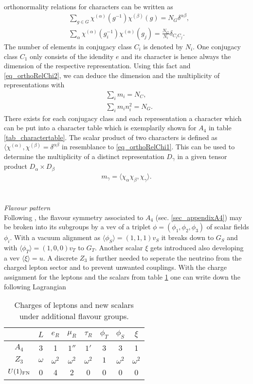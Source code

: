 orthonormality relations for characters can be written as
\begin{align}
 &\sum\limits_{g\in G} \chi^{(\alpha)}(g^{-1})\chi^{(\beta)}(g) = N_G \delta^{\alpha\beta},\label{eq_orthoRelChi1}\\
 &\sum\limits_\alpha \chi^{(\alpha)}(g^{-1}_i)\chi^{(\alpha)}(g_j) = \frac{N_G}{N_i} \delta_{C_iC_j}.
 \label{eq_orthoRelChi2}
\end{align}
The number of elements in conjugacy class $C_i$ is denoted by $N_i$. One conjugacy class $C_1$ only consists of the idendity $e$ and its character 
is hence always the dimension of the respective representation. Using this fact and \eqref{eq_orthoRelChi2}, we can deduce the dimension and the
multiplicity of representations with 
\begin{align}
 &\sum\limits_i m_i = N_C,\label{eq_multi1}\\
 &\sum\limits_i m_i n_i ^2 = N_G.\label{eq_multi2}
\end{align}
There exists for each conjugacy class and each representation a character which can be put into a character table which is exemplarily shown
for $A_4$ in table \ref{tab_charactertable}. The scalar product of two characters is defined as 
$\langle \chi^{(\alpha)},\chi^{(\beta)}=\delta^{\alpha\beta}$ in resemblance to \eqref{eq_orthoRelChi1}. This can be used to determine 
the multiplicity of a distinct representation $D_\gamma$ in a given tensor product $D_\alpha\times D_\beta$ \cite{1273369} 
\begin{align}
 m_\gamma = \langle \chi_\alpha \chi_\beta,\chi_\gamma\rangle.
 \label{eq_multiplicity}
\end{align}
\\ \\ \textit{Flavour pattern}\\
\noindent Following \cite{0512103}, the flavour symmetry associated to $A_4$ 
(sec. \ref{sec_appendixA4}) may be broken into its subgroups by a vev of a triplet 
$\phi=(\phi_1,\phi_2,\phi_3)$ of scalar fields $\phi_i$. With a vacuum alignment as $\langle\phi_S\rangle = (1,1,1)v_S$ it breaks down to $G_S$
and with $\langle\phi_T\rangle=(1,0,0)v_T$ to $G_T$. Another scalar $\xi$ gets introduced also developing a vev $\langle\xi\rangle=u$. 
A discrete $Z_3$ is further needed to seperate the neutrino from the charged lepton sector and to prevent unwanted couplings.
With the charge assignment for the leptons and the scalars from table \ref{tab_a4charges} one can write down the following Lagrangian
\begin{table}
 \begin{tabular}{c|cccc|ccc}
  &$L$&$e_R$&$\mu_R$&$\tau_R$&$\phi_T$&$\phi_S$&$\xi$\\
  \hline
  $A_4$ & 3&1&$1''$&$1'$&3&3&1\\
  $Z_3$ & $\omega$&$\omega^2$&$\omega^2$&$\omega^2$&$1$&$\omega^2$&$\omega^2$\\
  $U(1)_\text{FN}$ & 0&4&2&0&0&0&0
 \end{tabular}
\caption{Charges of leptons and new scalars under additional flavour groups.}
\label{tab_a4charges}
\end{table}
